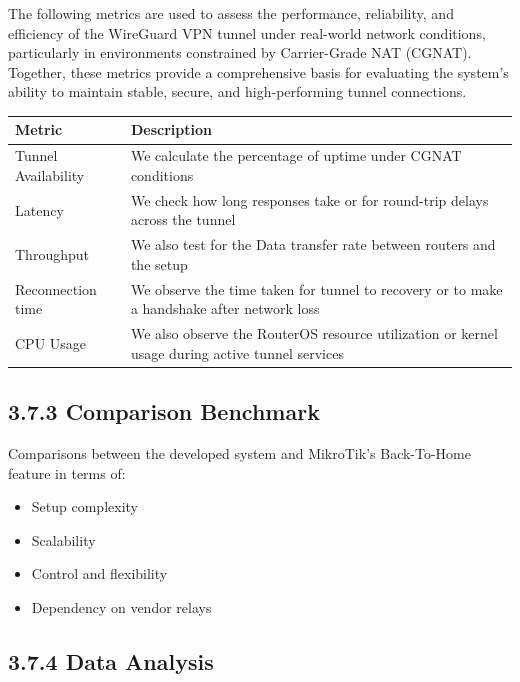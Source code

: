 \documentclass[12pt,a4paper,oneside]{report}
\begin{document}
The following metrics are used to assess the performance, reliability, and efficiency of the WireGuard VPN tunnel under real-world network conditions, particularly in environments constrained by Carrier-Grade NAT (CGNAT). Together, these metrics provide a comprehensive basis for evaluating the system's ability to maintain stable, secure, and high-performing tunnel connections.


\begin{table}[htbp]
  \centering
  {\small
  \begin{tabular}{|p{3.21cm}|p{8.00cm}|}
    \hline
    Metric & Description \\
    \hline
    Tunnel Availability & We calculate the percentage of uptime under CGNAT conditions \\
    Latency & We check how long responses take or for round-trip delays across the tunnel \\
    Throughput & We also test for the Data transfer rate between routers and the setup \\
    Reconnection time & We observe the time taken for tunnel to recovery or to make a handshake after network loss \\
    CPU Usage & We also observe the RouterOS resource utilization or kernel usage during active tunnel services \\
    \hline
  \end{tabular}
  }
\end{table}





\subsection{3.7.3 Comparison Benchmark}

Comparisons between the developed system and MikroTik's Back-To-Home feature in terms of:


\begin{itemize}
  \item Setup complexity 
  \item Scalability
  \item Control and flexibility
  \item Dependency on vendor relays
\end{itemize}

\subsection{3.7.4 Data Analysis}
\end{document}
